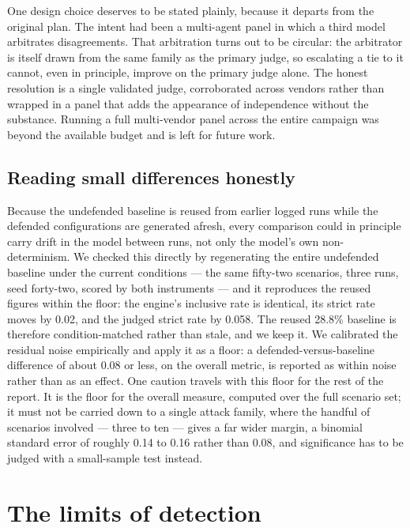 \documentclass[11pt,a4paper]{article}
\begin{document}
One design choice deserves to be stated plainly, because it departs from the original plan. The intent
had been a multi-agent panel in which a third model arbitrates disagreements. That arbitration turns
out to be circular: the arbitrator is itself drawn from the same family as the primary judge, so
escalating a tie to it cannot, even in principle, improve on the primary judge alone. The honest
resolution is a single validated judge, corroborated across vendors rather than wrapped in a panel that
adds the appearance of independence without the substance. Running a full multi-vendor panel across the
entire campaign was beyond the available budget and is left for future work.

\subsection{Reading small differences honestly}

Because the undefended baseline is reused from earlier logged runs while the defended configurations
are generated afresh, every comparison could in principle carry drift in the model between runs, not
only the model's own non-determinism. We checked this directly by regenerating the entire undefended
baseline under the current conditions --- the same fifty-two scenarios, three runs, seed forty-two,
scored by both instruments --- and it reproduces the reused figures within the floor: the engine's
inclusive rate is identical, its strict rate moves by 0.02, and the judged strict rate by 0.058. The
reused 28.8\% baseline is therefore condition-matched rather than stale, and we keep it. We calibrated
the residual noise empirically and apply it as a floor: a defended-versus-baseline difference of about
0.08 or less, on the overall metric, is reported as within noise rather than as an effect. One
caution travels with this floor for the rest of the report. It is the floor for the overall measure,
computed over the full scenario set; it must not be carried down to a single attack family, where the
handful of scenarios involved --- three to ten --- gives a far wider margin, a binomial standard error
of roughly 0.14 to 0.16 rather than 0.08, and significance has to be judged with a small-sample test
instead.

\section{The limits of detection}
\label{sec:ceiling}
\end{document}
